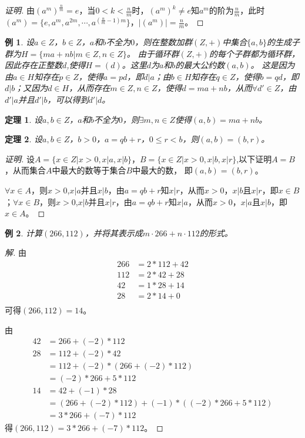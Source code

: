\documentclass{article}
\newtheorem{Thm}{定理}
\newtheorem*{Example}{例}
\begin{document}
\begin{CJK*}{UTF8}{gbsn}
\begin{proof}[证明]
    由$(a^m)^{\frac{n}{m}}=e$，当$0<k<\frac{n}{m}$时，$(a^m)^k\neq e$知$a^m$的阶为$\frac{n}{m}$，此时$(a^m)=\{e,a^m,a^{2m},\cdots,a^{(\frac{n}{m}-1)m}\}$，$|(a^m)|=\frac{n}{m}$。
  \end{proof}
  \begin{Example}
    设$a\in Z$，$b\in Z$，$a$和$b$不全为$0$，则在整数加群$(Z,+)$中集合$\{a,b\}$的生成子群为$H=\{ma+nb|m\in Z,n\in Z\}$。
    由于循环群$(Z,+)$的每个子群都为循环群，因此存在正整数$d$,使得$H=(d)$。这里$d$为$a$和$b$的最大公约数$(a,b)$。
    这是因为由$a\in H$知存在$p\in Z$，使得$a=pd$，即$d|a$；由$b\in H$知存在$q\in Z$，使得$b=qd$，即$d|b$；又因为$d\in H$，从而存在$m\in Z,n\in Z$，使得$d=ma+nb$，从而$\forall d'\in Z$，由$d'|a$并且$d'|b$，可以得到$d'|d$。
  \end{Example}
  \begin{Thm}
    设$a,b\in Z$，$a$和$b$不全为$0$，则$\exists m,n\in Z$使得$(a,b)=ma+nb$。
  \end{Thm}
  \begin{Thm}
    设$a,b\in Z$，$b>0$，$a=qb+r$，$0\leq r < b$，则$(a,b)=(b,r)$。
  \end{Thm}
  \begin{proof}[证明]
    设$A=\{x\in Z|x>0,x|a,x|b\}$，$B=\{x\in Z|x>0,x|b,x|r\}$,以下证明$A=B$，从而集合$A$中最大的数等于集合$B$中最大的数，
    即$(a,b)=(b,r)$。
  
    $\forall x\in A$，则$x>0$,$x|a$并且$x|b$，由$a=qb+r$知$x|r$，从而$x>0$，$x|b$且$x|r$，即$x\in B$；$\forall x\in B$，则$x>0$,$x|b$并且$x|r$，由$a=qb+r$知$x|a$，从而$x>0$，$x|a$且$x|b$，即$x\in A$。
  \end{proof}
  \begin{Example}
    计算$(266,112)$，并将其表示成$m\cdot 266 + n\cdot 112$的形式。
  \end{Example}
  \begin{proof}[解]
    由
    \begin{align*}
      266&=2*112+42\\
      112&=2*42+28\\
      42&=1*28+14\\
      28&=2*14+0\\
    \end{align*}
  可得$(266,112)=14$。
  
  由
  \begin{align*}
    42&=266+(-2)*112\\
    28&=112+(-2)*42\\
    &=112+(-2)*(266+(-2)*112)\\
    &=(-2)*266+5*112\\
    14&=42+(-1)*28\\
    &=(266+(-2)*112)+(-1)*((-2)*266+5*112)\\
    &=3*266+(-7)*112
  \end{align*}
  得$(266,112)=3*266+(-7)*112$。
  \end{proof}


\end{CJK*}
\end{document}
